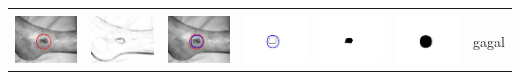 \begin{table}[H]
\begin{tabular}{|m{0.7in}|m{0.7in}|m{0.7in}|m{0.7in}|m{0.7in}|m{0.7in}|m{0.7in}|}
		&  &  & & & &  \\
		\includegraphics[width=0.7in]{dataset/dataset_3/luka_merah/ready/30_integer_init.jpg}&
		\includegraphics[width=0.7in]{dataset/dataset_3/luka_merah/ready/30_integer_ext.jpg}&
		\includegraphics[width=0.7in]{dataset/dataset_3/luka_merah/ready/30_integer_result.jpg}&
		\includegraphics[width=0.7in]{dataset/dataset_3/luka_merah/ready/30_gt_r_integer.jpg}&
		\includegraphics[width=0.7in]{dataset/dataset_3/luka_merah/ready/30_r.jpg}&
		\includegraphics[width=0.7in]{dataset/dataset_3/luka_merah/ready/30_integer_r.jpg}&
		gagal\\
		\hline
		

\end{tabular}
\end{table}
